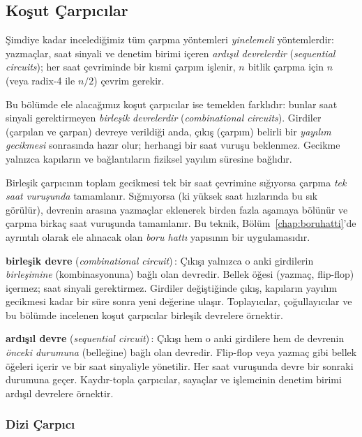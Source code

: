 \subsection{Koşut Çarpıcılar}
\label{sec:paralel-carpicilar}

Şimdiye kadar incelediğimiz tüm çarpma yöntemleri \emph{yinelemeli} yöntemlerdir: yazmaçlar, saat sinyali ve denetim birimi içeren \emph{ardışıl devrelerdir} (\emph{sequential circuits}); her saat çevriminde bir kısmi çarpım işlenir, $n$ bitlik çarpma için $n$ (veya radix-4 ile $n/2$) çevrim gerekir.

Bu bölümde ele alacağımız koşut çarpıcılar ise temelden farklıdır: bunlar saat sinyali gerektirmeyen \emph{birleşik devrelerdir} (\emph{combinational circuits}). Girdiler (çarpılan ve çarpan) devreye verildiği anda, çıkış (çarpım) belirli bir \emph{yayılım gecikmesi} sonrasında hazır olur; herhangi bir saat vuruşu beklenmez. Gecikme yalnızca kapıların ve bağlantıların fiziksel yayılım süresine bağlıdır.

Birleşik çarpıcının toplam gecikmesi tek bir saat çevrimine sığıyorsa çarpma \emph{tek saat vuruşunda} tamamlanır. Sığmıyorsa (ki yüksek saat hızlarında bu sık görülür), devrenin arasına yazmaçlar eklenerek birden fazla aşamaya bölünür ve çarpma birkaç saat vuruşunda tamamlanır. Bu teknik, Bölüm~\ref{chap:boruhatti}'de ayrıntılı olarak ele alınacak olan \emph{boru hattı} yapısının bir uygulamasıdır.

\begin{terimnotu}
\textbf{birleşik devre} (\emph{combinational circuit})\,: Çıkışı yalnızca o anki girdilerin \emph{birleşimine} (kombinasyonuna) bağlı olan devredir. Bellek öğesi (yazmaç, flip-flop) içermez; saat sinyali gerektirmez. Girdiler değiştiğinde çıkış, kapıların yayılım gecikmesi kadar bir süre sonra yeni değerine ulaşır. Toplayıcılar, çoğullayıcılar ve bu bölümde incelenen koşut çarpıcılar birleşik devrelere örnektir.

\textbf{ardışıl devre} (\emph{sequential circuit})\,: Çıkışı hem o anki girdilere hem de devrenin \emph{önceki durumuna} (belleğine) bağlı olan devredir. Flip-flop veya yazmaç gibi bellek öğeleri içerir ve bir saat sinyaliyle yönetilir. Her saat vuruşunda devre bir sonraki durumuna geçer. Kaydır-topla çarpıcılar, sayaçlar ve işlemcinin denetim birimi ardışıl devrelere örnektir.
\end{terimnotu}

\subsubsection{Dizi Çarpıcı}
\label{sec:dizi-carpici}

